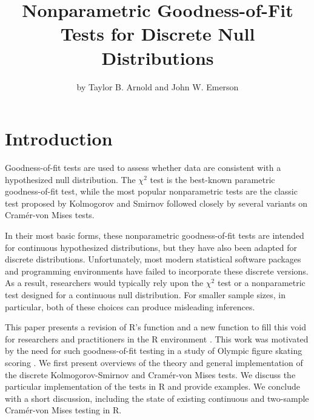 \title{Nonparametric Goodness-of-Fit Tests for Discrete Null Distributions}
\author{by Taylor B. Arnold and John W. Emerson}

\maketitle




\section{Introduction}

Goodness-of-fit tests are used to assess whether data are consistent
with a hypothesized null distribution.  The $\chi^2$ test is the best-known
parametric goodness-of-fit test, while the most popular nonparametric tests
are the classic test proposed by Kolmogorov and Smirnov followed closely by
several variants on Cram\'{e}r-von Mises tests.

In their most basic forms, these nonparametric goodness-of-fit
tests are intended for continuous hypothesized distributions, but they have
also been adapted for discrete distributions.  Unfortunately,
most modern statistical software packages and programming environments
have failed to incorporate these discrete versions.  As a result,
researchers would typically rely upon the $\chi^2$ test or
a nonparametric test designed for a continuous null distribution.
For smaller sample sizes, in particular, both of these choices can produce
misleading inferences.

This paper presents a revision of R's
 function and a new  function to
fill this void for researchers and practitioners in the R environment
\citep{R2010}. This
work was motivated by the need for such goodness-of-fit testing in a study
of Olympic figure skating scoring \citep{emersonarnold2010}.  
We first present overviews of the theory and general implementation of the
discrete Kolmogorov-Smirnov and Cram\'{e}r-von Mises tests.  We discuss
the particular implementation of the tests in R and provide examples.  We
conclude with a short discussion, including the state of existing continuous
and two-sample Cram\'{e}r-von Mises testing in R.


